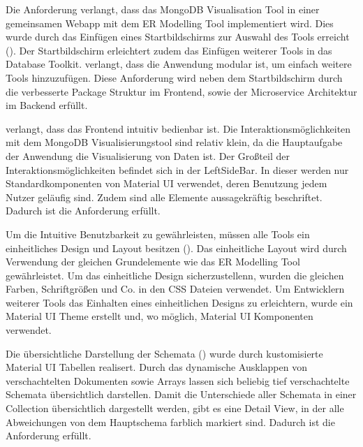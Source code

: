 \iffalse
Aufgabe des Kapitels Evaluierung ist es, in wie weit die Ziele der 
Arbeit erreicht wurden. Es sollen also die erreichten Arbeitsergebnisse 
mit den Zielen verglichen werden. Ergebnis der Evaluierung kann auch 
sein, das bestimmte Ziele nicht erreicht werden konnten, wobei die 
Ursachen hierfür auch außerhalb des Verantwortungsbereichs des 
Praktikanten liegen können.
\fi

Die Anforderung  verlangt, dass das MongoDB Visualisation Tool in einer gemeinsamen Webapp mit dem ER Modelling Tool implementiert wird.
Dies wurde durch das Einfügen eines Startbildschirms zur Auswahl des Tools erreicht ().
Der Startbildschirm erleichtert zudem das Einfügen weiterer Tools in das Database Toolkit.
 verlangt, dass die Anwendung modular ist, um einfach weitere Tools hinzuzufügen.
Diese Anforderung wird neben dem Startbildschirm durch die verbesserte Package Struktur im Frontend, sowie der Microservice Architektur im Backend erfüllt.

 verlangt, dass das Frontend intuitiv bedienbar ist.
Die Interaktionsmöglichkeiten mit dem MongoDB Visualisierungstool sind relativ klein, da die Hauptaufgabe der Anwendung die Visualisierung von Daten ist.
Der Großteil der Interaktionsmöglichkeiten befindet sich in der LeftSideBar.
In dieser werden nur Standardkomponenten von Material UI verwendet, deren Benutzung jedem Nutzer geläufig sind.
Zudem sind alle Elemente aussagekräftig beschriftet.
Dadurch ist die Anforderung  erfüllt.

Um die Intuitive Benutzbarkeit zu gewährleisten, müssen alle Tools ein einheitliches Design und Layout besitzen ().
Das einheitliche Layout wird durch Verwendung der gleichen Grundelemente wie das ER Modelling Tool gewährleistet.
Um das einheitliche Design sicherzustellenn, wurden die gleichen Farben, Schriftgrößen und Co. in den CSS Dateien verwendet.
Um Entwicklern weiterer Tools das Einhalten eines einheitlichen Designs zu erleichtern, wurde ein Material UI Theme erstellt und, wo möglich, Material UI Komponenten verwendet.

Die übersichtliche Darstellung der Schemata () wurde durch kustomisierte Material UI Tabellen realisert.
Durch das dynamische Ausklappen von verschachtelten Dokumenten sowie Arrays lassen sich beliebig tief verschachtelte Schemata übersichtlich darstellen.
Damit die Unterschiede aller Schemata in einer Collection übersichtlich dargestellt werden, gibt es eine Detail View, in der alle Abweichungen von dem Hauptschema farblich markiert sind.
Dadurch ist die Anforderung  erfüllt.

